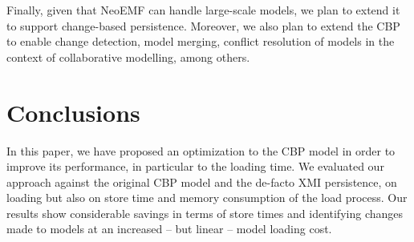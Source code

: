 \documentclass{llncs}
\begin{document}
Finally, given that NeoEMF can handle large-scale models, we plan to extend it to support change-based persistence.
Moreover, we also plan to extend the CBP to enable change detection, model merging, conflict resolution of models in the context of collaborative modelling, among others. 

\section{Conclusions}
\label{sec:conclusions}
In this paper, we have proposed an optimization to the CBP model in order to improve its performance, in particular to the loading time.
We evaluated our approach against the original CBP model and the de-facto XMI persistence, on loading but also on store time and memory consumption of the load process. 
Our results show considerable savings in terms of store times and identifying changes made to models at an increased -- but linear -- model loading cost. 


 

\end{document}
